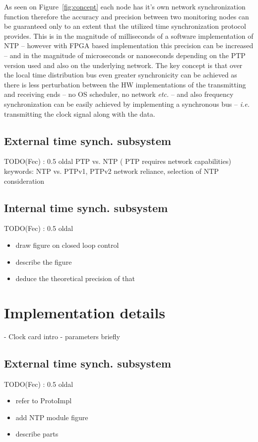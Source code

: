 \documentclass[article]{IEEEtran}
\begin{document}
As seen on Figure~\ref{fig:concept} each node has it's own network synchronization function therefore the accuracy and
precision between two monitoring nodes can be guaranteed only to an extent that the utilized time synchronization
protocol provides. This is in the magnitude of milliseconds of a software implementation of NTP -- however with FPGA based implementation
this precision can be increased --  and in the magnitude of
microseconds or nanoseconds depending on the PTP version used and also on the underlying network.
The key concept is that over the local time distribution bus even greater synchronicity can be achieved as there is less
perturbation between the HW implementations of the transmitting and receiving ends -- no OS scheduler, no network \emph{etc.} --
and also frequency synchronization can be easily achieved by implementing a synchronous bus -- \emph{i.e.} transmitting the
clock signal along with the data.

\subsection{External time synch. subsystem}
TODO(Fec) : 0.5 oldal PTP vs. NTP ( PTP requires network capabilities)
keywords: NTP vs. PTPv1, PTPv2 network reliance, selection of NTP consideration

\subsection{Internal time synch. subsystem}
TODO(Fec) : 0.5 oldal
 \begin{itemize}
 	\item draw figure on closed loop control 
 	\item describe the figure
 	\item deduce the theoretical precision of that
 \end{itemize}

\section{Implementation details}\label{sec:Impl}

- Clock card intro 
- parameters briefly

\subsection{External time synch. subsystem}
TODO(Fec) : 0.5 oldal
 \begin{itemize}
 	\item refer to ProtoImpl
 	\item add NTP module figure
 	\item describe parts
 \end{itemize}
\end{document}
